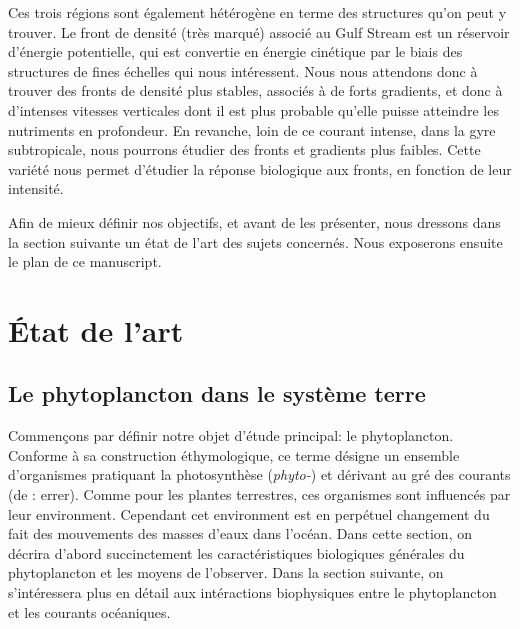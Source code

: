 Ces trois régions sont également hétérogène en terme des structures qu'on peut y trouver.
Le front de densité (très marqué) associé au Gulf Stream est un réservoir d'énergie potentielle, qui est convertie en énergie cinétique par le biais des structures de fines échelles qui nous intéressent.
Nous nous attendons donc à trouver des fronts de densité plus stables, associés à de forts gradients, et donc à d'intenses vitesses verticales dont il est plus probable qu'elle puisse atteindre les nutriments en profondeur.
En revanche, loin de ce courant intense, dans la gyre subtropicale, nous pourrons étudier des fronts et gradients plus faibles.
Cette variété nous permet d'étudier la réponse biologique aux fronts, en fonction de leur intensité.

Afin de mieux définir nos objectifs, et avant de les présenter, nous dressons dans la section suivante un état de l'art des sujets concernés.
Nous exposerons ensuite le plan de ce manuscript.

\section{État de l'art}
\label{sec:etat-de-lart}

\subsection{Le phytoplancton dans le système terre}
\label{sec:phyto-ds-sys-terre}


Commençons par définir notre objet d'étude principal: le phytoplancton.
Conforme à sa construction éthymologique, ce terme désigne un ensemble d'organismes pratiquant la photosynthèse (\emph{phyto-}) et dérivant au gré des courants (de : errer).
Comme pour les plantes terrestres, ces organismes sont influencés par leur environment.
Cependant cet environment est en perpétuel changement du fait des mouvements des masses d'eaux dans l'océan.
Dans cette section, on décrira d'abord succinctement les caractéristiques biologiques générales du phytoplancton et les moyens de l'observer.
Dans la section suivante, on s'intéressera plus en détail aux intéractions biophysiques entre le phytoplancton et les courants océaniques.


